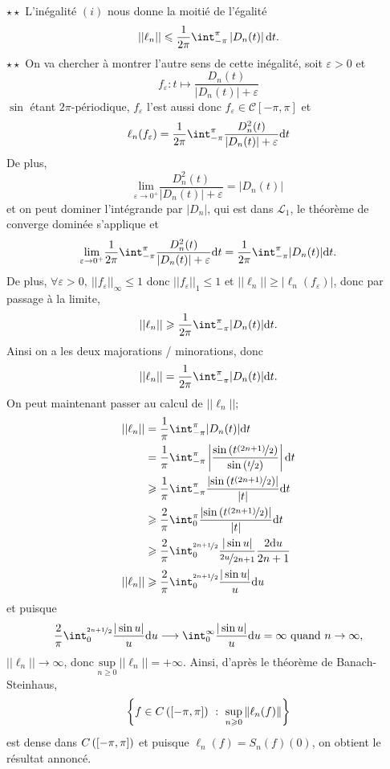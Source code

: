 \documentclass[a4paper,11pt, twoside]{article}
\begin{document}
\begin{Proof}
  $\star\star$ L'inégalité $(i)$ nous donne la moitié de l'égalité
  $$||\ell_n||\leqslant\frac{1}{2\pi}\int_{-\pi}^{\pi}\left|D_n(t)\right|\dt.$$
  $\star\star$ On va chercher à montrer l'autre sens de cette inégalité, soit $\varepsilon>0$ et 
  $$f_\varepsilon:t\longmapsto \frac{D_n(t)}{|D_n(t)|+\varepsilon}$$
  $\sin$ étant $2\pi$-périodique, $f_\varepsilon$ l'est aussi donc $f_\varepsilon\in\mathcal C[-\pi,\pi]$ et 
  $$\ell_n(f_\varepsilon)=\frac{1}{2\pi}\int_{-\pi}^{\pi}\frac{D_n^2(t)}{|D_n(t)|+\varepsilon}\dt$$
  De plus, 
  $$\underset{\varepsilon\to 0^+}{\mathrm{lim}}\frac{D_n^2(t)}{|D_n(t)|+\varepsilon}=|D_n(t)|$$
  et on peut dominer l'intégrande par $|D_n|$, qui est dans $\mathcal L_1$, le théorème de converge dominée s'applique et
  $$\underset{\varepsilon\to 0^+}{\mathrm{lim}}\frac{1}{2\pi}\int_{-\pi}^{\pi}\frac{D_n^2(t)}{|D_n(t)|+\varepsilon}\dt=\frac{1}{2\pi}\int_{-\pi}^{\pi}|D_n(t)|\dt.$$
  De plus, $\forall \varepsilon>0,\ ||f_\varepsilon||_\infty\leqslant 1$ donc $||f_\varepsilon||_1\leqslant 1$ et $||\ell_n||\geqslant |\ell_n(f_\varepsilon)|$, donc par passage à la limite, 
  $$||\ell_n||\geqslant \frac{1}{2\pi}\int_{-\pi}^{\pi}|D_n(t)|\dt.$$
  Ainsi on a les deux majorations / minorations, donc 
  $$||\ell_n||= \frac{1}{2\pi}\int_{-\pi}^{\pi}|D_n(t)|\dt.$$
  On peut maintenant passer au calcul de $||\ell_n||$;
  \begin{align*}
    ||\ell_n||&=\frac{1}{\pi}\int_{-\pi}^{\pi}|D_n(t)|\dt\\
    &=\frac{1}{\pi}\int_{-\pi}^{\pi}\left|\frac{\sin\left(t\nicefrac{(2n+1)}{2}\right)}{\sin\left(\nicefrac{t}{2}\right)}\right|\dt\\
    &\geqslant\frac{1}{\pi}\int_{-\pi}^{\pi}\frac{\left|\sin\left(t\nicefrac{(2n+1)}{2}\right)\right|}{|t|}\dt\\
    &\geqslant\frac{2}{\pi}\int_0^{\pi}\frac{\left|\sin\left(t\nicefrac{(2n+1)}{2}\right)\right|}{|t|}\dt\\
    &\geqslant \frac{2}{\pi}\int_0^{\nicefrac{2n+1}{2}}\frac{|\sin u|}{\nicefrac{2u}{2n+1}}\frac{2\mathrm du}{2n+1}\\
    ||\ell_n||&\geqslant \frac{2}{\pi}\int_0^{\nicefrac{2n+1}{2}}\frac{|\sin u|}{u}\mathrm du\\
  \end{align*}
  et puisque 
  $$\frac{2}{\pi}\int_0^{\nicefrac{2n+1}{2}}\frac{|\sin u|}{u}\mathrm du\longrightarrow\dstyle\int_{0}^{\infty}\frac{|\sin u|}{u}\mathrm du = \infty\text{ quand }n\to\infty,$$
  $||\ell_n||\longrightarrow\infty$, donc $\underset{n\geqslant 0}{\mathrm{sup}}\ ||\ell_n||=+\infty$. Ainsi, d'après le théorème de Banach-Steinhaus,
  $$\ens{f\in C\Par{[-\pi,\pi]}\ :\ \underset{n\geqslant 0}{\mathrm{sup}}\norm{\ell_n(f)}}$$
  est dense dans $C\left([-\pi,\pi]\right)$ et puisque $\ell_n(f)=S_n(f)(0)$, on obtient le résultat annoncé.
\end{Proof}
\end{document}
